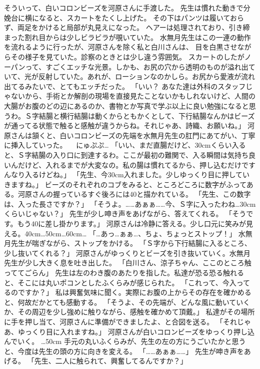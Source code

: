 そういって、白いコロンビーズを河原さんに手渡した。
先生は慣れた動きで分娩台に横になると、スカートをたくし上げた。
その下はパンツは履いておらず、両足をかけると局部が丸見えになった。
ヘアーは処理されており、引き締まった割れ目からは少しビラビラが覗いていた。
水無月先生はこの一連の動作を流れるように行ったが、河原さんを除く私と白川さんは、
目を白黒させながらその様子を見ていた。診察のときとは少し違う雰囲気。
スカートのしたがノーパンって、すごくエッチな光景。しかも、お尻の穴から透明のものが溢れ出ていて、光が反射していた。あれが、ローションなのかしら。お尻から愛液が流れ出てるみたいで、とてもエッチだった。
「いい？ あなた達は外科のスタッフじゃないから、手術とか解剖の現場を直接見たことないかもしれないけど、人間の大腸がお腹のどの辺にあるのか、書物とか写真で学ぶ以上に良い勉強になると思うわ。Ｓ字結腸と横行結腸は動くからともかくとして、下行結腸なんかはビーズが通ってる状態で触ると感触が違うからね。それじゃあ、詩織、お願いね。」
河原さんは頷くと、白いコロンビーズの先端を水無月先生の肛門にあてがい、丁寧に挿入していった。
　にゅぷぷ…
「いい、まだ直腸だけど、30cmくらい入ると、Ｓ字結腸の入り口に到達するわ。ここが最初の難関で、入る瞬間は気持ち良いんだけど、入れるまでが大変なの。私の腸は慣れてるから、押し込むだけですんなり入るけどね。」
「先生、今30cm入れました。少しゆっくり目に押していきますね。」
ビーズのそれぞれのコブをみると、ところどころに数字がふってある。河原さんの握っているすぐ後ろには40と描かれている。
「先生、この数字は、入った長さですか？」
「そうよ。……あぁぁ……今、Ｓ字に入ったわね…30cmくらいじゃない？」
先生が少し呻き声をあげながら、答えてくれる。
「そうです。もう40に差し掛かります。」
河原さんは冷静に答える。少し口元に笑みが見える。40cm…50cm…60cm…
「…あっ…ぁぁ…、ちょ、ちょっとストップ！」
水無月先生が喘ぎながら、ストップをかける。
「Ｓ字から下行結腸に入るところ、少し抜いてくれる？」
河原さんがゆっくりとビーズを引き抜いていく。水無月先生が少し大きく息を吐き出した。
「白川さん、涼子ちゃん、ここのところ触っててごらん」
先生は左のわき腹のあたりを指した。私達が恐る恐る触れると、そこには丸いポコンとしたふくらみが感じられた。
「これって、今入ってるのですか？」
私は興奮気味に聞く。実際にお腹の上からその存在を確かめると、何故だかとても感動する。
「そうよ、その先端が、どんな風に動いていくか、その周辺を少し強めに触りながら、感触を確かめて頂戴。」
私達がその場所に手を押し当て、河原さんに準備ができましたよ、と合図を送る。
「それじゃあ、ゆっくり目に入れますね。」
河原さんが白いコロンビーズをゆっくり押し込んでいく。 …50cm
手元の丸いふくらみが、先生の左の方にうごいたかと思うと、今度は先生の頭の方に向きを変える。
「……あぁぁ……」
先生が呻き声をあげる。
「先生、二人に触られて、興奮してるんですか？」

